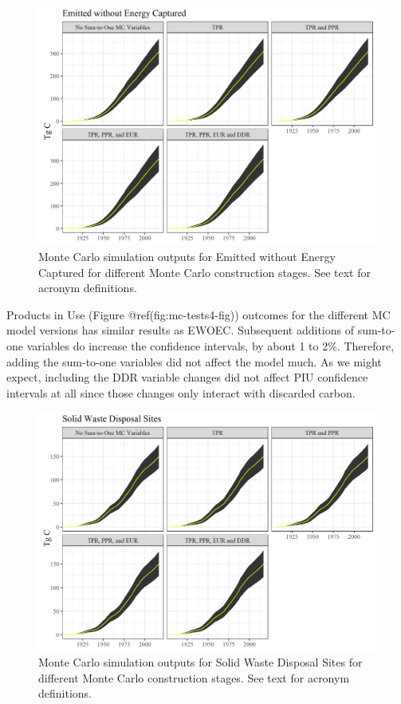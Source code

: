 \documentclass[
  openany]{book}
\begin{document}
\begin{figure}
\includegraphics[width=1\linewidth]{images/MC_tests2} \caption{Monte Carlo simulation outputs for Emitted without Energy Captured for different Monte Carlo construction stages.  See text for acronym definitions.}\label{fig:mc-tests2-fig}
\end{figure}

Products in Use (Figure @ref(fig:mc-tests4-fig)) outcomes for the
different MC model versions has similar results as EWOEC. Subsequent
additions of sum-to-one variables do increase the confidence intervals,
by about 1 to 2\%. Therefore, adding the sum-to-one variables did not
affect the model much. As we might expect, including the DDR variable
changes did not affect PIU confidence intervals at all since those
changes only interact with discarded carbon.

\begin{figure}
\includegraphics[width=1\linewidth]{images/MC_tests3} \caption{Monte Carlo simulation outputs for Solid Waste Disposal Sites for different Monte Carlo construction stages.  See text for acronym definitions.}\label{fig:mc-tests3-fig}
\end{figure}
\end{document}
